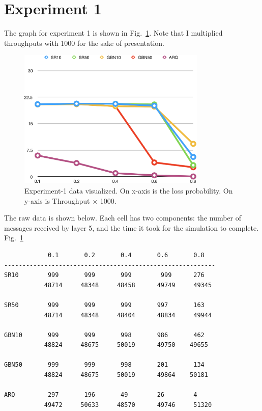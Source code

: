 \section*{Experiment 1}

The graph for experiment 1 is shown in Fig.~\ref{fig:chart1}. Note
that I multiplied throughputs with 1000 for the sake of presentation.

\begin{figure}[!ht]
  \includegraphics[width=0.8\textwidth]{chart1-fig}
  \caption{Experiment-1 data visualized. On x-axis is the loss
  probability. On y-axis is Throughput $\times$ 1000.}
  \label{fig:chart1}
\end{figure}

The raw data is shown below. Each cell has two components: the number
of messages received by layer 5, and the time it took for the
simulation to complete.
Fig.~\ref{fig:chart1}
\begin{center}
\begin{verbatim}
            0.1       0.2       0.4       0.6       0.8
----------------------------------------------------------
SR10        999       999       999        999      276
           48714     48348     48458      49749     49345

SR50        999       999       999       997       163
           48714     48348     48404      48834     49944

GBN10       999       999       998       986       462
           48824     48675     50019      49750    49655

GBN50       999       999       998       201       134
           48824     48675     50019      49864    50181

ARQ         297       196       49        26        4
           49472     50633     48570      49746     51320
\end{verbatim}
\end{center}

